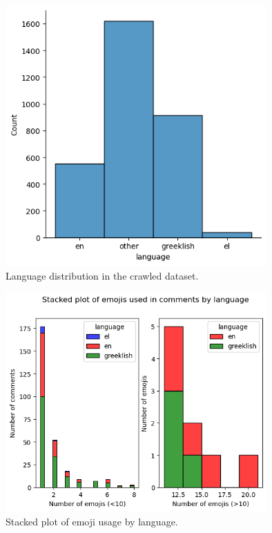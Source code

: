 \documentclass[11pt, a4paper]{article}
\begin{document}
	
	\begin{figure}[h!]
		\includegraphics[width=10cm]{lang_dis.png}
		\centering
		\caption{Language distribution in the crawled dataset.}
		\label{fig::lang_dis}
	\end{figure}
	
	\begin{figure}[h!]
		\includegraphics[width=10cm]{emojis_dis.png}
		\centering
		\caption{Stacked plot of emoji usage by language.}
		\label{fig::emojis_dist}
	\end{figure}
	
\end{document}
